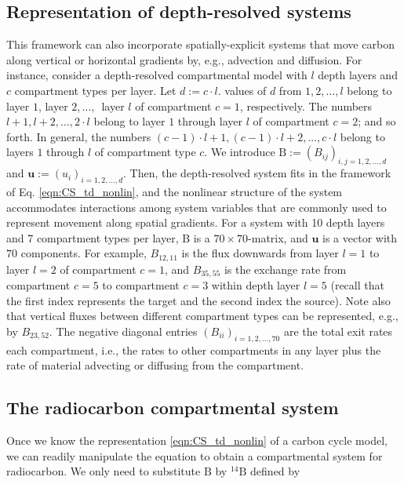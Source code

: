 \documentclass[11pt,a4paper]{article}
\newcommand{\red}[1]{\textcolor{red}{#1}}
\renewcommand{\vec}[1]{\mathbf{#1}}
\newcommand{\tens}[1]{\mathrm{#1}}
\begin{document}
    
\subsection{Representation of depth-resolved systems}
    This framework can also incorporate spatially-explicit systems that move carbon along vertical or horizontal gradients by, e.g., advection and diffusion.  For instance, consider a depth-resolved compartmental model with $l$ depth layers and $c$ compartment types per layer.
    Let $d:=c \cdot l$. 
    values of $d$ from $1,2, \ldots, l$  belong to layer $1$, layer $2$,$\,\ldots,\,$ layer $l$ of compartment $c =  1$, respectively.
    The numbers $l+1,l+2,\ldots,2 \cdot l$ belong to layer $1$ through layer $l$ of compartment $c = 2$; and so forth.
    In general, the numbers $(c-1) \cdot l+1,(c-1) \cdot l+2,\ldots,c \cdot l$ belong to layers $1$ through $l$ of compartment type $c$.
    We introduce $\tens{B}:=(B_{ij})_{i,j=1,2,\ldots,d}$ and $\vec{u}:=(u_i)_{i=1,2,\ldots,d}$.
    Then, the depth-resolved system fits in the framework of Eq. \eqref{eqn:CS_td_nonlin}, and the nonlinear structure of the system accommodates interactions among system variables that are commonly used to represent movement along spatial gradients.
    For a system with 10 depth layers and 7 compartment types per layer, $\tens{B}$ is a $70\times 70$-matrix, and $\vec{u}$ is a vector with $70$ components.
    For example, $B_{12,11}$ is the flux downwards from layer $l = 1$ to layer $l = 2$ of compartment $c = 1$, and $B_{35,55}$ is the exchange rate from compartment $c = 5$  to compartment $c = 3$ within depth layer $l = 5$ (recall that the first index represents the target and the second index the source).
    Note  also that vertical fluxes between different compartment types can be represented, e.g., by $B_{23,52}$. 
    The negative diagonal entries $(B_{ii})_{i=1,2,\ldots,70}$ are the total exit rates each compartment, i.e., the rates to other compartments  in any layer plus the rate of material advecting or diffusing from the compartment.
    

\subsection{The radiocarbon compartmental system}
    Once we know the representation \eqref{eqn:CS_td_nonlin} of a carbon cycle model, we can readily manipulate the equation to obtain a compartmental system for radiocarbon.
    We only need to substitute $\tens{B}$ by ${}^{14}\tens{B}$ defined by
    
\end{document}
